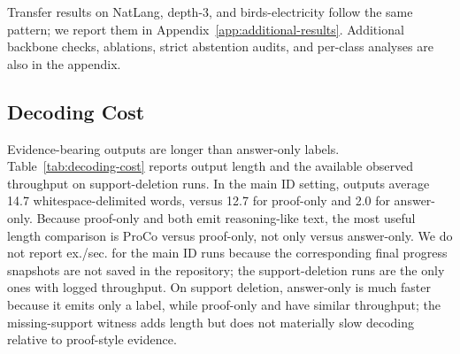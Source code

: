 \begin{table}[t]
\centering
\small

\caption{Scaling with larger train budgets.}
\label{tab:scaling-results}
\end{table}

Transfer results on NatLang, depth-3, and birds-electricity follow the same
pattern; we report them in Appendix~\ref{app:additional-results}. Additional
backbone checks, ablations, strict abstention audits, and per-class analyses
are also in the appendix.

\subsection{Decoding Cost}

Evidence-bearing outputs are longer than answer-only labels. Table~\ref{tab:decoding-cost}
reports output length and the available observed throughput on support-deletion
runs. In the main ID setting, \model{} outputs average 14.7
whitespace-delimited words, versus 12.7 for proof-only and 2.0 for answer-only.
Because proof-only and \model{} both emit reasoning-like text, the most useful
length comparison is ProCo versus proof-only, not only versus answer-only. We do
not report ex./sec. for the main ID runs because the corresponding final
progress snapshots are not saved in the repository; the support-deletion runs
are the only ones with logged throughput. On support deletion, answer-only is
much faster because it emits only a label, while proof-only and \model{} have
similar throughput; the missing-support witness adds length but does not
materially slow decoding relative to proof-style evidence.

\begin{table}[t]
\centering
\small

\caption{Decoding-cost summary. Output length is measured from generated text in
the saved predictions. Ex./sec. is reported where final progress logs are
available.}
\label{tab:decoding-cost}
\end{table}
